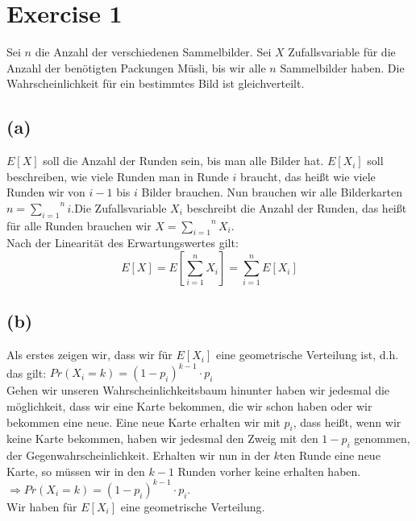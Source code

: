 \section*{Exercise 1}

Sei $n$ die Anzahl der verschiedenen Sammelbilder. Sei $X$ Zufallsvariable für die Anzahl der benötigten Packungen Müsli, bis wir alle $n$ Sammelbilder haben. Die Wahrscheinlichkeit für ein bestimmtes Bild ist gleichverteilt.


\subsection*{(a)}

$E[X]$ soll die Anzahl der Runden sein, bis man alle Bilder hat. $E[ X_i ]$ soll beschreiben, wie viele Runden man in Runde $i$ braucht, das heißt wie viele Runden wir von $i-1$ bis $i$ Bilder brauchen. Nun brauchen wir alle Bilderkarten $n = \overset{n}{\underset{i=1}{\sum}} i$.Die Zufallsvariable $X_i$ beschreibt die Anzahl der Runden, das heißt für alle Runden brauchen wir $X = \overset{n}{\underset{i=1}{\sum}} X_i$.\\
Nach der Linearität des Erwartungswertes gilt:\\
$$E[ X ] = E \left[ \sum_{i=1}^{n} X_i \right] = \sum_{i=1}^{n} E[ X_i ]$$




\subsection*{(b)}

Als erstes zeigen wir, dass wir für $E[X_i]$ eine geometrische Verteilung ist, d.h. das gilt:
$Pr(X_i = k) = (1 - p_i)^{k-1}\cdot p_i$ \\

Gehen wir unseren Wahrscheinlichkeitsbaum hinunter haben wir jedesmal die möglichkeit, dass wir eine Karte bekommen, die wir schon haben oder wir bekommen eine neue. Eine neue Karte erhalten wir mit $p_i$, dass heißt, wenn wir keine Karte bekommen, haben wir jedesmal den Zweig mit den $1-p_i$ genommen, der Gegenwahrscheinlichkeit. Erhalten wir nun in der $k$ten Runde eine neue Karte, so müssen wir in den $k-1$ Runden vorher keine erhalten haben. $\Rightarrow Pr(X_i = k) = (1-p_i)^{k-1} \cdot p_i$.\\
Wir haben für $E[X_i]$ eine geometrische Verteilung.

